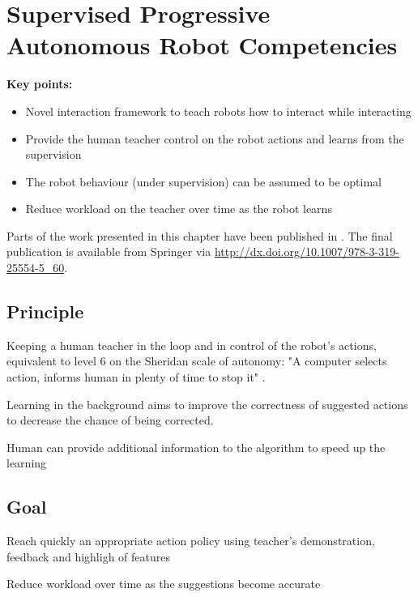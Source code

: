 \chapter{Supervised Progressive Autonomous Robot Competencies}\label{chap:sparc}

\begin{framed}
	\textbf{Key points:}
	
	\begin{itemize}
		\item Novel interaction framework to teach robots how to interact while interacting
		\item Provide the human teacher control on the robot actions and learns from the supervision
		\item The robot behaviour (under supervision) can be assumed to be optimal
		\item Reduce workload on the teacher over time as the robot learns
	\end{itemize}
\end{framed}

Parts of the work presented in this chapter have been published in \cite{senft2015sparc}. The final publication is available from Springer via \url{http://dx.doi.org/10.1007/978-3-319-25554-5_60}.

\newpage

\section{Principle}

\cite{senft2015sparc}

Keeping a human teacher in the loop and in control of the robot's actions,
equivalent to level 6 on the Sheridan scale of autonomy: "A computer selects
action, informs human in plenty of time to stop it" \cite{sheridan1978human}.

Learning in the background aims to improve the correctness of suggested actions
to decrease the chance of being corrected.

Human can provide additional information to the algorithm to speed up the
learning

\section{Goal}

Reach quickly an appropriate action policy using teacher's demonstration,
feedback and highligh of features

Reduce workload over time as the suggestions become accurate


